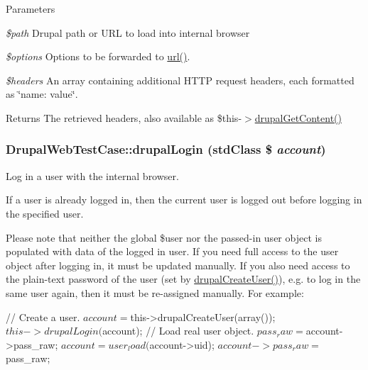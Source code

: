 \begin{DoxyParams}{Parameters}
\item[{\em \$path}]Drupal path or URL to load into internal browser \item[{\em \$options}]Options to be forwarded to \hyperlink{common_8inc_a43b2a0594431556db49df980801d8807}{url()}. \item[{\em \$headers}]An array containing additional HTTP request headers, each formatted as \char`\"{}name: value\char`\"{}. \end{DoxyParams}
\begin{DoxyReturn}{Returns}
The retrieved headers, also available as \$this-\/$>$\hyperlink{classDrupalWebTestCase_a65cc4334da96452d127a9fb50636e7bb}{drupalGetContent()} 
\end{DoxyReturn}
\hypertarget{classDrupalWebTestCase_adfe40530cc8242db7a5e42542c20cfc2}{
\subsubsection[{drupalLogin}]{\setlength{\rightskip}{0pt plus 5cm}DrupalWebTestCase::drupalLogin (stdClass \$ {\em account})}}
\label{classDrupalWebTestCase_adfe40530cc8242db7a5e42542c20cfc2}
Log in a user with the internal browser.

If a user is already logged in, then the current user is logged out before logging in the specified user.

Please note that neither the global \$user nor the passed-\/in user object is populated with data of the logged in user. If you need full access to the user object after logging in, it must be updated manually. If you also need access to the plain-\/text password of the user (set by \hyperlink{classDrupalWebTestCase_acc3d96e30db573b45744aef79af11862}{drupalCreateUser()}), e.g. to log in the same user again, then it must be re-\/assigned manually. For example: 
\begin{DoxyCode}
   // Create a user.
   $account = $this->drupalCreateUser(array());
   $this->drupalLogin($account);
   // Load real user object.
   $pass_raw = $account->pass_raw;
   $account = user_load($account->uid);
   $account->pass_raw = $pass_raw;
\end{DoxyCode}




